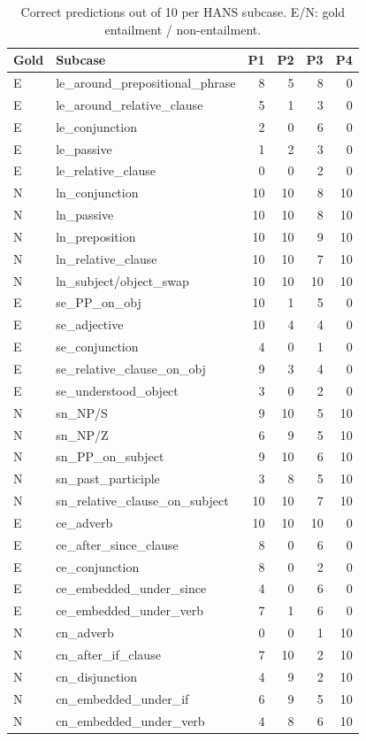 \begin{table}[t]
\centering
\scriptsize
\begin{tabular}{llrrrr}
\toprule
Gold & Subcase & P1 & P2 & P3 & P4 \\
\midrule
E & le\_around\_prepositional\_phrase & 8 & 5 & 8 & 0 \\
E & le\_around\_relative\_clause & 5 & 1 & 3 & 0 \\
E & le\_conjunction & 2 & 0 & 6 & 0 \\
E & le\_passive & 1 & 2 & 3 & 0 \\
E & le\_relative\_clause & 0 & 0 & 2 & 0 \\
N & ln\_conjunction & 10 & 10 & 8 & 10 \\
N & ln\_passive & 10 & 10 & 8 & 10 \\
N & ln\_preposition & 10 & 10 & 9 & 10 \\
N & ln\_relative\_clause & 10 & 10 & 7 & 10 \\
N & ln\_subject/object\_swap & 10 & 10 & 10 & 10 \\
\midrule
E & se\_PP\_on\_obj & 10 & 1 & 5 & 0 \\
E & se\_adjective & 10 & 4 & 4 & 0 \\
E & se\_conjunction & 4 & 0 & 1 & 0 \\
E & se\_relative\_clause\_on\_obj & 9 & 3 & 4 & 0 \\
E & se\_understood\_object & 3 & 0 & 2 & 0 \\
N & sn\_NP/S & 9 & 10 & 5 & 10 \\
N & sn\_NP/Z & 6 & 9 & 5 & 10 \\
N & sn\_PP\_on\_subject & 9 & 10 & 6 & 10 \\
N & sn\_past\_participle & 3 & 8 & 5 & 10 \\
N & sn\_relative\_clause\_on\_subject & 10 & 10 & 7 & 10 \\
\midrule
E & ce\_adverb & 10 & 10 & 10 & 0 \\
E & ce\_after\_since\_clause & 8 & 0 & 6 & 0 \\
E & ce\_conjunction & 8 & 0 & 2 & 0 \\
E & ce\_embedded\_under\_since & 4 & 0 & 6 & 0 \\
E & ce\_embedded\_under\_verb & 7 & 1 & 6 & 0 \\
N & cn\_adverb & 0 & 0 & 1 & 10 \\
N & cn\_after\_if\_clause & 7 & 10 & 2 & 10 \\
N & cn\_disjunction & 4 & 9 & 2 & 10 \\
N & cn\_embedded\_under\_if & 6 & 9 & 5 & 10 \\
N & cn\_embedded\_under\_verb & 4 & 8 & 6 & 10 \\
\bottomrule
\end{tabular}
\caption{Correct predictions out of 10 per HANS subcase. E/N: gold entailment / non-entailment.}
\label{tab:subcase}
\end{table}
